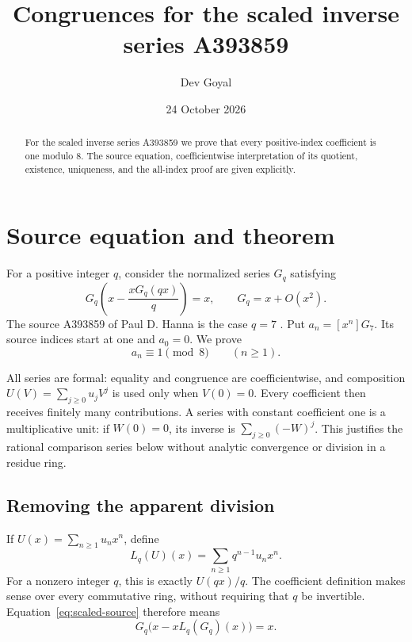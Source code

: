 \documentclass[11pt,a4paper]{article}
\title{Congruences for the scaled inverse series A393859}
\author{Dev Goyal}
\date{24 October 2026}
\theoremstyle{remark}\newtheorem{remark}[theorem]{Remark}
\begin{document}
\maketitle
\begin{center}\end{center}

\begin{abstract}
For the scaled inverse series A393859 we prove that every
positive-index coefficient is one modulo 8.
The source equation, coefficientwise interpretation of its quotient,
existence, uniqueness, and the all-index proof are given explicitly.
\end{abstract}
\section{Source equation and theorem}
For a positive integer $q$, consider the normalized series $G_q$ satisfying
\begin{equation}\label{eq:scaled-source}
 G_q\left(x-\frac{xG_q(qx)}q\right)=x,
 \qquad G_q=x+O(x^2).
\end{equation}
The source A393859 of Paul D. Hanna is the case $q=7$
\cite{oeis}. Put $a_n=[x^n]G_{7}$. Its source indices
start at one and $a_0=0$. We prove
\[
 a_n\equiv1\pmod{8}\qquad(n\ge1).
\]

All series are formal: equality and congruence are coefficientwise, and
composition $U(V)=\sum_{j\ge0}u_jV^j$ is used only when $V(0)=0$.
Every coefficient then receives finitely many contributions.
A series with constant coefficient one is a multiplicative unit:
if $W(0)=0$, its inverse is $\sum_{j\ge0}(-W)^j$.
This justifies the rational comparison series below without analytic
convergence or division in a residue ring.
\subsection{Removing the apparent division}

If $U(x)=\sum_{n\ge1}u_nx^n$, define
\[
L_q(U)(x)=\sum_{n\ge1}q^{n-1}u_nx^n.
\]
For a nonzero integer $q$, this is exactly $U(qx)/q$. The coefficient
definition makes sense over every commutative ring, without requiring
that $q$ be invertible. Equation~\eqref{eq:scaled-source} therefore
means
\begin{equation}\label{eq:scaled-nodiv}
G_q\bigl(x-xL_q(G_q)(x)\bigr)=x.
\end{equation}
\end{document}
